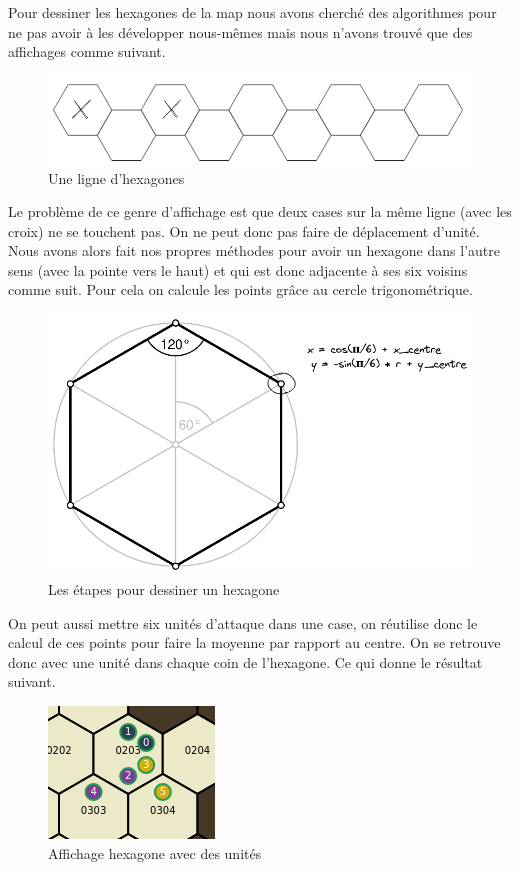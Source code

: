 Pour dessiner les hexagones de la map nous avons cherché des algorithmes pour ne pas avoir à les développer nous-mêmes mais nous n'avons trouvé que des affichages comme suivant.

\begin{figure}[H]
    \centering
    \includegraphics[scale=0.3]{data/hexmap_exemple.png}
    \caption{Une ligne d'hexagones}
\end{figure}

Le problème de ce genre d'affichage est que deux cases sur la même ligne (avec les croix) ne se touchent pas. On ne peut donc pas faire de déplacement d'unité. Nous avons alors fait nos propres méthodes pour avoir un hexagone dans l'autre sens (avec la pointe vers le haut) et qui est donc adjacente à ses six voisins comme suit. Pour cela on calcule les points grâce au cercle trigonométrique.

\begin{figure}[H]
    \centering
    \includegraphics[scale=0.3]{data/hexagon.png}
    \caption{Les étapes pour dessiner un hexagone}
\end{figure}

On peut aussi mettre six unités d'attaque dans une case, on réutilise donc le calcul de ces points pour faire la moyenne par rapport au centre. On se retrouve donc avec une unité dans chaque coin de l'hexagone. Ce qui donne le résultat suivant.

\begin{figure}[H]
    \centering
    \includegraphics[scale=.7]{data/hexagon_with_units.png}
    \caption{Affichage hexagone avec des unités}
\end{figure}

